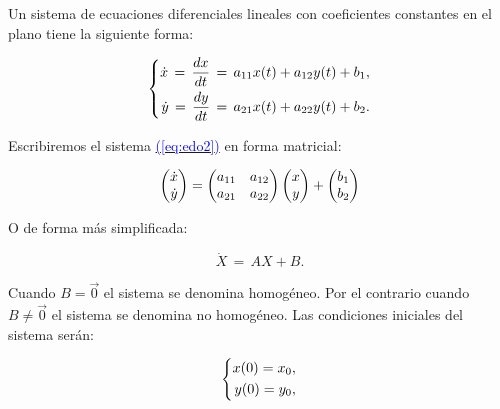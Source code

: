 \documentclass[12pt,a4paper]{report} %
\newcommand{\eref}[1]{\hyperref[#1]{\textcolor{blue}{(\ref*{#1})}}}
\newcommand{\eref}[1]{\hyperref[#1]{\textcolor{blue}{\textit{(\ref*{#1})}}}}
\begin{document}
	\vspace{0.5cm} Un sistema de ecuaciones diferenciales lineales con coeficientes constantes en el plano tiene la siguiente forma:
	
	\begin{equation}
		\label{eq:edo2}
		\scalebox{1}{$\displaystyle
			\left\{
			\begin{aligned}
				\dot{x}\,=\,\frac{dx}{dt}\,=\,a_{11}x(t)+a_{12}y(t)+b_1, \\
				\dot{y}\,=\,\frac{dy}{dt}\,=\,a_{21}x(t)+a_{22}y(t)+b_2.
			\end{aligned}
			\right.
			$}
	\end{equation}\smallskip
	
	\noindent Escribiremos el sistema \eref{eq:edo2} en forma matricial:
	
	\begin{equation}
		\label{eq:matrxedo2}
		\scalebox{1}{$\displaystyle
		\begin{pmatrix}
			\dot{x}\\
			\dot{y}\\
		\end{pmatrix} =
		\begin{pmatrix}
			a_{11} & a_{12}\\
		    a_{21} & a_{22}\\
		\end{pmatrix} 
		\begin{pmatrix}
			x\\
			y\\
		\end{pmatrix} + 
		\begin{pmatrix}
			b_1\\
			b_2\\
		\end{pmatrix}
		$}
	\end{equation} \smallskip
	
	\noindent O de forma más simplificada:
	
	\begin{equation}
		\label{eq:sisautonomo}
		\dot{X}\,=\,AX+B.
	\end{equation}\smallskip
	
	\noindent Cuando $B=\vec{0}$ el sistema se denomina homogéneo. Por el contrario cuando $B\neq\vec{0}$ el sistema se denomina no homogéneo. Las condiciones iniciales del sistema serán:
	
	\begin{equation}
		\label{eq:ci}
		\scalebox{1}{$\displaystyle
			\left\{
			\begin{aligned}
				x(0)=x_0, \\
			    y(0)=y_0,
			\end{aligned}
			\right.
			$}
	\end{equation}\smallskip
	
\end{document}
